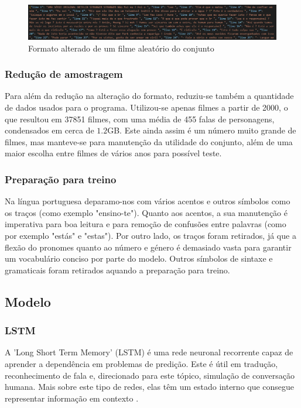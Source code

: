 \documentclass{article}
\begin{document}
\begin{figure}
	\centering
    \includegraphics[scale=0.28]{json.png}
    \caption{Formato alterado de um filme aleatório do conjunto}
    \label{jsonimg}
\end{figure}

\subsubsection{Redução de amostragem}
Para além da redução na alteração do formato, reduziu-se também a quantidade de dados usados para o programa. Utilizou-se apenas filmes a partir de 2000, o que resultou em 37851 filmes, com uma média de 455 falas de personagens, condensados em cerca de $1.2$GB. Este ainda assim é um número muito grande de filmes, mas manteve-se para manutenção da utilidade do conjunto, além de uma maior escolha entre filmes de vários anos para possível teste.

\subsubsection{Preparação para treino}
Na língua portuguesa deparamo-nos com vários acentos e outros símbolos como os traços (como exemplo "ensino-te"). Quanto aos acentos, a sua manutenção é imperativa para boa leitura e para remoção de confusões entre palavras (como por exemplo "estás" e "estas"). Por outro lado, os traços foram retirados, já que a flexão do pronomes quanto ao número e género é demasiado vasta para garantir um vocabulário conciso por parte do modelo. Outros símbolos de sintaxe e gramaticais foram retirados aquando a preparação para treino.


\subsection{Modelo}


\subsubsection{LSTM}
A 'Long Short Term Memory' (LSTM) é uma rede neuronal recorrente capaz de aprender a dependência em problemas de predição. Este é útil em tradução, reconhecimento de fala e, direcionado para este tópico, simulação de conversação humana. Mais sobre este tipo de redes, elas têm um estado interno que consegue representar informação em contexto \cite{bengio1994learning}.
\end{document}

